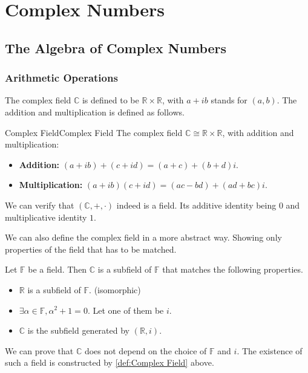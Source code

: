\documentclass[../main.tex]{subfiles}
\begin{document}
\chapter{Complex Numbers}

\section{The Algebra of Complex Numbers}

\subsection{Arithmetic Operations}
The complex field $\mathbb{C}$ is defined to be $\mathbb{R} \times \mathbb{R}$, with $a+ib$ stands for $(a,b)$. The addition and multiplication is defined as follows.
\begin{definition}{Complex Field}{Complex Field}
The complex field $\mathbb{C}\cong \mathbb{R} \times \mathbb{R}$, with  addition and multiplication:
\begin{itemize}
\item \textbf{Addition: } $(a+ib)+(c+id) = (a+c) + (b+d)i$.
\item \textbf{Multiplication: }  $(a+ib)(c+id) = (ac-bd) + (ad+bc)i$.
\end{itemize}
\end{definition}

We can verify that $\left(\mathbb{C},+, \cdot \right)$ indeed is a field. Its additive identity being $0$ and multiplicative identity $1$.

\begin{remark}
We can also define the complex field in a more abstract way. Showing only properties of the field that has to be matched. 

Let $\mathbb{F}$ be a field. Then $\mathbb{C}$ is a subfield of $\mathbb{F}$ that matches the following properties.
\begin{itemize}
\item $\mathbb{R}$ is a subfield of $\mathbb{F}$. (isomorphic)
\item $\exists \alpha\in \mathbb{F},\alpha^2+1=0$. Let one of them be $i$.
\item $\mathbb{C}$ is the subfield generated by $\left(\mathbb{R},i\right)$.
\end{itemize}

We can prove that $\mathbb{C}$ does not depend on the choice of $\mathbb{F}$ and $i$. The existence of such a field is constructed by \ref{def:Complex Field} above.
\end{remark}
\end{document}
